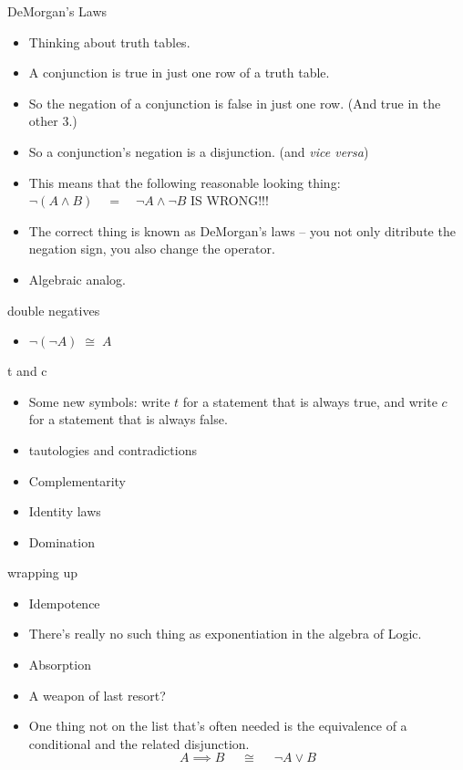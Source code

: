 \documentclass[landscape]{beamer}
\begin{document}
\begin{frame}{DeMorgan's Laws}
\begin{itemize}
\item Thinking about truth tables. \pause
\item A conjunction is true in just one row of a truth table. \pause
\item So the negation of a conjunction is false in just one row. \pause \newline
(And true in the other 3.) \pause
\item So a conjunction's negation is a disjunction. \pause (and {\em vice versa}) \pause
\item This means that the following reasonable looking thing: \pause \newline
$\displaystyle \lnot (A \land B) \quad = \quad \lnot A \land \lnot B $ \pause \hspace{4ex} IS WRONG!!! \pause
\item The correct thing is known as DeMorgan's laws -- you not only ditribute the negation sign, you also change the operator.\pause
\item Algebraic analog.
\end{itemize}
\end{frame}

\begin{frame}{double negatives}
\begin{itemize}
\item $ \lnot(\lnot A) \; \cong \; A$ \pause
\end{itemize}
\end{frame}

\begin{frame}{t and c}
\begin{itemize}
\item  Some new symbols: write $t$ for a statement that is always true,\pause \newline
and write $c$ for a statement that is always false. \pause
\item tautologies and contradictions \pause
\item Complementarity\pause
\item Identity laws\pause
\item Domination
\end{itemize}
\end{frame}

\begin{frame}{wrapping up}
\begin{itemize}
\item Idempotence \pause
\item There's really no such thing as exponentiation in the algebra of Logic.\pause
\item Absorption \pause
\item A weapon of last resort?
\item One thing not on the list that's often needed is the equivalence of a conditional and the related disjunction. \pause
\[ A \implies B \quad \; \cong \; \quad \lnot A \lor B \]
\end{itemize}
\end{frame}
\end{document}
